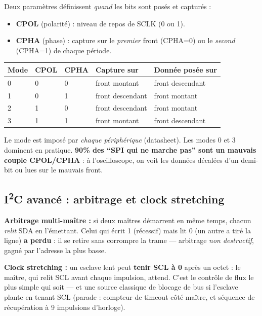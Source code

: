 \documentclass[12pt,a4paper,twoside]{book}
\begin{document}
\begin{formule}
Deux paramètres définissent \textit{quand} les bits sont posés et capturés :
\begin{itemize}[nosep]
\item \textbf{CPOL} (polarité) : niveau de repos de SCLK (0 ou 1).
\item \textbf{CPHA} (phase) : capture sur le \textit{premier} front (CPHA=0) ou le \textit{second} (CPHA=1) de chaque période.
\end{itemize}

\begin{center}
\renewcommand{\arraystretch}{1.35}
\begin{tabular}{p{1.5cm}p{1.3cm}p{1.3cm}p{3.6cm}p{3.6cm}}
\toprule
\textbf{Mode} & \textbf{CPOL} & \textbf{CPHA} & \textbf{Capture sur} & \textbf{Donnée posée sur} \\
\midrule
0 & 0 & 0 & front montant & front descendant \\
1 & 0 & 1 & front descendant & front montant \\
2 & 1 & 0 & front descendant & front montant \\
3 & 1 & 1 & front montant & front descendant \\
\bottomrule
\end{tabular}
\end{center}

Le mode est imposé par \textit{chaque périphérique} (datasheet). Les modes 0 et 3 dominent en pratique. \textbf{90\% des ``SPI qui ne marche pas'' sont un mauvais couple CPOL/CPHA} : à l'oscilloscope, on voit les données décalées d'un demi-bit ou lues sur le mauvais front.
\end{formule}

\subsection{I\textsuperscript{2}C avancé : arbitrage et clock stretching}

\begin{formule}
\textbf{Arbitrage multi-maître :} si deux maîtres démarrent en même temps, chacun \textit{relit} SDA en l'émettant. Celui qui écrit 1 (récessif) mais lit 0 (un autre a tiré la ligne) \textbf{a perdu} : il se retire sans corrompre la trame --- arbitrage \textit{non destructif}, gagné par l'adresse la plus basse.

\textbf{Clock stretching :} un esclave lent peut \textbf{tenir SCL à 0} après un octet : le maître, qui relit SCL avant chaque impulsion, attend. C'est le contrôle de flux le plus simple qui soit --- et une source classique de blocage de bus si l'esclave plante en tenant SCL (parade : compteur de timeout côté maître, et séquence de récupération à 9 impulsions d'horloge).
\end{formule}
\end{document}
